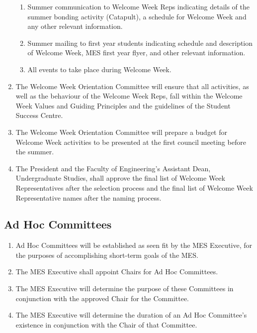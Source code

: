 \begin{enumerate}
  \begin{enumerate}
   \item
    Summer communication to Welcome Week Reps indicating details of the summer bonding activity (Catapult), a schedule for Welcome Week and any other relevant information.
   \item
    Summer mailing to first year students indicating schedule and description of Welcome Week, MES first year flyer, and other relevant information.
   \item
    All events to take place during Welcome Week.
  \end{enumerate}
 \item
  The Welcome Week Orientation Committee will ensure that all activities, as well as the behaviour of the Welcome Week Reps, fall within the Welcome Week Values and Guiding Principles and the guidelines of the Student Success Centre.
 \item
  The Welcome Week Orientation Committee will prepare a budget for Welcome Week activities to be presented at the first council meeting before the summer.
 \item
  The President and the Faculty of Engineering's Assistant Dean, Undergraduate Studies, shall approve the final list of Welcome Week Representatives after the selection process and the final list of Welcome Week Representative names after the naming process.

\end{enumerate}

\subsection{Ad Hoc Committees}
\label{ad-hoc-committees}
\begin{enumerate}
 \item
  Ad Hoc Committees will be established as seen fit by the MES Executive, for the purposes of accomplishing short-term goals of the MES.
 \item
  The MES Executive shall appoint Chairs for Ad Hoc Committees.
 \item
  The MES Executive will determine the purpose of these Committees in conjunction with the approved Chair for the Committee.
 \item
  The MES Executive will determine the duration of an Ad Hoc Committee's existence in conjunction with the Chair of that Committee.

\end{enumerate}

